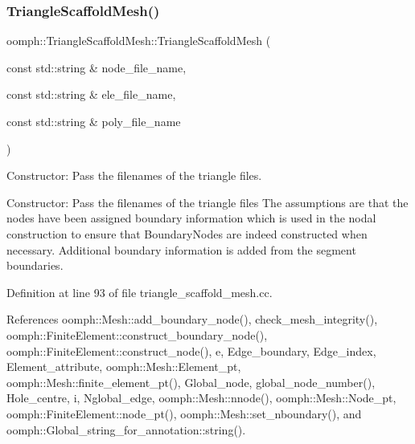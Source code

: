 \subsubsection{\texorpdfstring{Triangle\+Scaffold\+Mesh()}{TriangleScaffoldMesh()}\hspace{0.1cm}{\footnotesize\ttfamily [2/4]}}
{\footnotesize\ttfamily oomph\+::\+Triangle\+Scaffold\+Mesh\+::\+Triangle\+Scaffold\+Mesh (\begin{DoxyParamCaption}\item[{const std\+::string \&}]{node\+\_\+file\+\_\+name,  }\item[{const std\+::string \&}]{ele\+\_\+file\+\_\+name,  }\item[{const std\+::string \&}]{poly\+\_\+file\+\_\+name }\end{DoxyParamCaption})}



Constructor\+: Pass the filenames of the triangle files. 

Constructor\+: Pass the filenames of the triangle files The assumptions are that the nodes have been assigned boundary information which is used in the nodal construction to ensure that Boundary\+Nodes are indeed constructed when necessary. Additional boundary information is added from the segment boundaries. 

Definition at line 93 of file triangle\+\_\+scaffold\+\_\+mesh.\+cc.



References oomph\+::\+Mesh\+::add\+\_\+boundary\+\_\+node(), check\+\_\+mesh\+\_\+integrity(), oomph\+::\+Finite\+Element\+::construct\+\_\+boundary\+\_\+node(), oomph\+::\+Finite\+Element\+::construct\+\_\+node(), e, Edge\+\_\+boundary, Edge\+\_\+index, Element\+\_\+attribute, oomph\+::\+Mesh\+::\+Element\+\_\+pt, oomph\+::\+Mesh\+::finite\+\_\+element\+\_\+pt(), Global\+\_\+node, global\+\_\+node\+\_\+number(), Hole\+\_\+centre, i, Nglobal\+\_\+edge, oomph\+::\+Mesh\+::nnode(), oomph\+::\+Mesh\+::\+Node\+\_\+pt, oomph\+::\+Finite\+Element\+::node\+\_\+pt(), oomph\+::\+Mesh\+::set\+\_\+nboundary(), and oomph\+::\+Global\+\_\+string\+\_\+for\+\_\+annotation\+::string().

\mbox{\label{classoomph_1_1TriangleScaffoldMesh_a228c2b0bf8ae759cc5bd0e22220db044}} 
